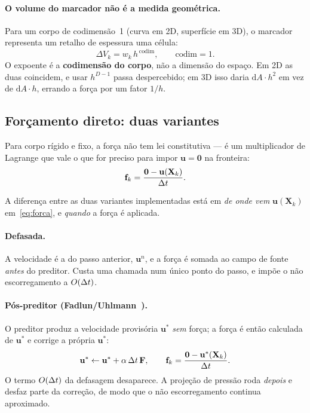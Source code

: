 \paragraph{O volume do marcador não é a medida geométrica.} Para um corpo de
codimensão~1 (curva em 2D, superfície em 3D), o marcador representa um retalho de
espessura uma célula:
\begin{equation}
  \Delta V_k = w_k \, h^{\,\mathrm{codim}} , \qquad \mathrm{codim} = 1 .
\end{equation}
O expoente é a \textbf{codimensão do corpo}, não a dimensão do espaço. Em 2D as
duas coincidem, e usar $h^{D-1}$ passa despercebido; em 3D isso daria
$\mathrm{d}A\cdot h^2$ em vez de $\mathrm{d}A\cdot h$, errando a força por um
fator $1/h$.

\subsection{Forçamento direto: duas variantes}

Para corpo rígido e fixo, a força não tem lei constitutiva --- é um
multiplicador de Lagrange que vale o que for preciso para impor
$\mathbf{u}=\mathbf{0}$ na fronteira:
\begin{equation}
  \mathbf{f}_k = \frac{\mathbf{0} - \mathbf{u}(\mathbf{X}_k)}{\Delta t}.
  \label{eq:forca}
\end{equation}

A diferença entre as duas variantes implementadas está em \emph{de onde vem}
$\mathbf{u}(\mathbf{X}_k)$ em~\eqref{eq:forca}, e \emph{quando} a força é
aplicada.

\paragraph{Defasada.} A velocidade é a do passo anterior, $\mathbf{u}^n$, e a
força é somada ao campo de fonte \emph{antes} do preditor. Custa uma chamada
num único ponto do passo, e impõe o não escorregamento a $O(\Delta t)$.

\paragraph{Pós-preditor (Fadlun/Uhlmann~\cite{uhlmann2005}).} O preditor produz
a velocidade provisória $\mathbf{u}^*$ \emph{sem} força; a força é então
calculada de $\mathbf{u}^*$ e corrige a própria $\mathbf{u}^*$:
\begin{equation}
  \mathbf{u}^* \leftarrow \mathbf{u}^* + \alpha\,\Delta t\,\mathbf{F}, \qquad
  \mathbf{f}_k = \frac{\mathbf{0}-\mathbf{u}^*(\mathbf{X}_k)}{\Delta t}.
\end{equation}
O termo $O(\Delta t)$ da defasagem desaparece. A projeção de pressão roda
\emph{depois} e desfaz parte da correção, de modo que o não escorregamento
continua aproximado.

